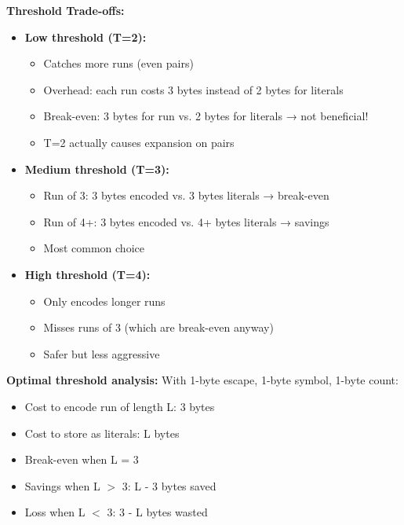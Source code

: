 \begin{importantbox}
\textbf{Threshold Trade-offs:}

\begin{itemize}
    \item \textbf{Low threshold (T=2):}
    \begin{itemize}
        \item Catches more runs (even pairs)
        \item Overhead: each run costs 3 bytes instead of 2 bytes for literals
        \item Break-even: 3 bytes for run vs. 2 bytes for literals → not beneficial!
        \item T=2 actually causes expansion on pairs
    \end{itemize}
    
    \item \textbf{Medium threshold (T=3):}
    \begin{itemize}
        \item Run of 3: 3 bytes encoded vs. 3 bytes literals → break-even
        \item Run of 4+: 3 bytes encoded vs. 4+ bytes literals → savings
        \item Most common choice
    \end{itemize}
    
    \item \textbf{High threshold (T=4):}
    \begin{itemize}
        \item Only encodes longer runs
        \item Misses runs of 3 (which are break-even anyway)
        \item Safer but less aggressive
    \end{itemize}
\end{itemize}

\textbf{Optimal threshold analysis:}
With 1-byte escape, 1-byte symbol, 1-byte count:
\begin{itemize}
    \item Cost to encode run of length L: 3 bytes
    \item Cost to store as literals: L bytes
    \item Break-even when L = 3
    \item Savings when L $>$ 3: L - 3 bytes saved
    \item Loss when L $<$ 3: 3 - L bytes wasted
\end{itemize}
\end{importantbox}

